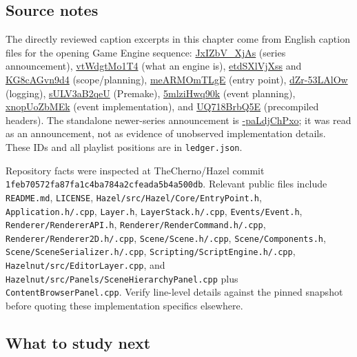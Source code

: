 \subsection{Source notes}\label{06-engine-ii-ch042-source-notes}

The directly reviewed caption excerpts in this chapter come from English caption files for the opening Game Engine sequence: \href{https://www.youtube.com/watch?v=JxIZbV_XjAs}{JxIZbV\_XjAs} (series announcement), \href{https://www.youtube.com/watch?v=vtWdgtMo1T4}{vtWdgtMo1T4} (what an engine is), \href{https://www.youtube.com/watch?v=etdSXlVjXss}{etdSXlVjXss} and \href{https://www.youtube.com/watch?v=KG8cAGvn9d4}{KG8cAGvn9d4} (scope/planning), \href{https://www.youtube.com/watch?v=meARMOmTLgE}{meARMOmTLgE} (entry point), \href{https://www.youtube.com/watch?v=dZr-53LAlOw}{dZr-53LAlOw} (logging), \href{https://www.youtube.com/watch?v=sULV3aB2qeU}{sULV3aB2qeU} (Premake), \href{https://www.youtube.com/watch?v=5mlziHwq90k}{5mlziHwq90k} (event planning), \href{https://www.youtube.com/watch?v=xnopUoZbMEk}{xnopUoZbMEk} (event implementation), and \href{https://www.youtube.com/watch?v=UQ718BrbQ5E}{UQ718BrbQ5E} (precompiled headers). The standalone newer-series announcement is \href{https://www.youtube.com/watch?v=-paLdjChPxo}{-paLdjChPxo}; it was read as an announcement, not as evidence of unobserved implementation details. These IDs and all playlist positions are in \texttt{ledger.json}.

Repository facts were inspected at TheCherno/Hazel commit \texttt{1feb70572fa87fa1c4ba784a2cfeada5b4a500db}. Relevant public files include \texttt{README.md}, \texttt{LICENSE}, \texttt{Hazel/src/Hazel/Core/EntryPoint.h}, \texttt{Application.h/.cpp}, \texttt{Layer.h}, \texttt{LayerStack.h/.cpp}, \texttt{Events/Event.h}, \texttt{Renderer/RendererAPI.h}, \texttt{Renderer/RenderCommand.h/.cpp}, \texttt{Renderer/Renderer2D.h/.cpp}, \texttt{Scene/Scene.h/.cpp}, \texttt{Scene/Components.h}, \texttt{Scene/SceneSerializer.h/.cpp}, \texttt{Scripting/ScriptEngine.h/.cpp}, \texttt{Hazelnut/src/EditorLayer.cpp}, and \texttt{Hazelnut/src/Panels/SceneHierarchyPanel.cpp} plus \texttt{ContentBrowserPanel.cpp}. Verify line-level details against the pinned snapshot before quoting these implementation specifics elsewhere.

\subsection{What to study next}\label{06-engine-ii-ch042-what-to-study-next}

